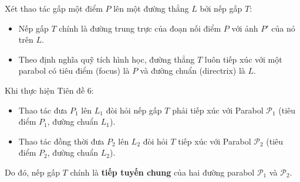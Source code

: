 Xét thao tác gấp một điểm $P$ lên một đường thẳng $L$ bởi nếp gấp $T$:
\begin{itemize}
    \item Nếp gấp $T$ chính là đường trung trực của đoạn nối điểm $P$ với ảnh $P'$ của nó trên $L$.
    \item Theo định nghĩa quỹ tích hình học, đường thẳng $T$ luôn tiếp xúc với một parabol có tiêu điểm (focus) là $P$ và đường chuẩn (directrix) là $L$.
\end{itemize}

Khi thực hiện Tiên đề 6:
\begin{itemize}
    \item Thao tác đưa $P_1$ lên $L_1$ đòi hỏi nếp gấp $T$ phải tiếp xúc với Parabol $\mathcal{P}_1$ (tiêu điểm $P_1$, đường chuẩn $L_1$).
    \item Thao tác đồng thời đưa $P_2$ lên $L_2$ đòi hỏi $T$ tiếp xúc với Parabol $\mathcal{P}_2$ (tiêu điểm $P_2$, đường chuẩn $L_2$).
\end{itemize}

Do đó, nếp gấp $T$ chính là \textbf{tiếp tuyến chung} của hai đường parabol $\mathcal{P}_1$ và $\mathcal{P}_2$.

